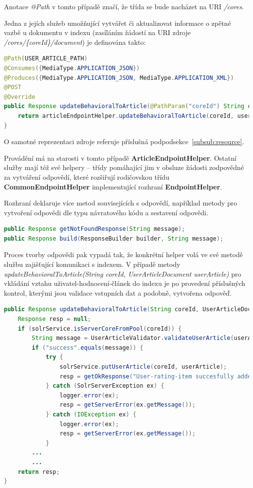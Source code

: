 \documentclass[thesis=M,czech]{FITthesis}[2014/05/07]
\begin{document}
Anotace \emph{@Path} v tomto případě značí, že třída se bude nacházet na URI \emph{/cores}.

Jedna z jejích služeb umožňující vytvářet či aktualizovat informace o zpětné vazbě u dokumentu v indexu (zasíláním žádostí na URI zdroje \emph{/cores/\{coreId\}/document}) je definována takto:

\begin{lstlisting}[language=java]
@Path(USER_ARTICLE_PATH)
@Consumes({MediaType.APPLICATION_JSON})
@Produces({MediaType.APPLICATION_JSON, MediaType.APPLICATION_XML})
@POST
@Override
public Response updateBehavioralToArticle(@PathParam("coreId") String coreId, UserArticleDocument userArticle) {
    return articleEndpointHelper.updateBehavioralToArticle(coreId, userArticle);
} 
\end{lstlisting}

O samotné reprezentaci zdroje referuje příslušná podpodsekce~\ref{subsub:resource}.

Provádění má na starosti v tomto případě \textbf{ArticleEndpointHelper}. Ostatní služby mají též své helpery – třídy pomáhající jim v obsluze žádosti zodpovědné za vytváření odpovědí, které rozšiřují rodičovskou třídu \textbf{CommonEndpointHelper} implementující rozhraní \textbf{EndpointHelper}.

Rozhraní deklaruje více metod souvisejících s odpovědí, například metody pro vytvoření odpovědi dle typu návratového kódu a sestavení odpovědi.

\begin{lstlisting}[language=java]
public Response getNotFoundResponse(String message);
public Response build(ResponseBuilder builder, String message);
\end{lstlisting}

Proces tvorby odpovědi pak vypadá tak, že konkrétní helper volá ve své metodě službu zajišťující komunikaci s indexem. V případě metody \emph{updateBehavioralToArticle(String coreId, UserArticleDocument userArticle)} pro vkládání vztahu uživatel-hodnocení-článek do indexu je po provedení příslušných kontrol, kterými jsou validace vstupních dat a podobně, vytvořena odpověď.

\begin{lstlisting}[language=java]
public Response updateBehavioralToArticle(String coreId, UserArticleDocument userArticle) {
    Response resp = null;
    if (solrService.isServerCoreFromPool(coreId)) {
        String message = UserArticleValidator.validateUserArticle(userArticle);
        if ("success".equals(message)) {
            try {
                solrService.putUserArticle(coreId, userArticle);
                resp = getOkResponse("User-rating-item succesfully added into Solr core.");
            } catch (SolrServerException ex) {
                logger.error(ex);
                resp = getServerError(ex.getMessage());
            } catch (IOException ex) {
                logger.error(ex);
                resp = getServerError(ex.getMessage());
            }
		...
		...
    return resp;
}
\end{lstlisting}
\end{document}
